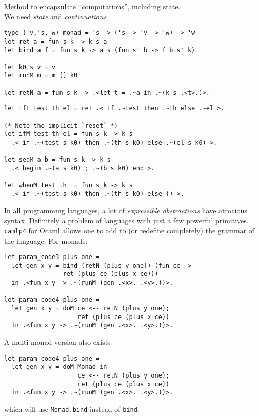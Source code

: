 \documentclass[landscape]{slides}
\begin{document}
\begin{slide}
    Method to encapsulate ``computations'', including state.\\
    We need \emph{state} and \emph{continuations}
\begin{verbatim}
type ('v,'s,'w) monad = 's -> ('s -> 'v -> 'w) -> 'w
let ret a = fun s k -> k s a
let bind a f = fun s k -> a s (fun s' b -> f b s' k)

let k0 s v = v
let runM m = m [] k0

let retN a = fun s k -> .<let t = .~a in .~(k s .<t>.)>.
\end{verbatim}
\end{slide}

\begin{slide}
\begin{verbatim}
let ifL test th el = ret .< if .~test then .~th else .~el >.

(* Note the implicit `reset` *)
let ifM test th el = fun s k -> k s
  .< if .~(test s k0) then .~(th s k0) else .~(el s k0) >.

let seqM a b = fun s k -> k s 
  .< begin .~(a s k0) ; .~(b s k0) end >.

let whenM test th  = fun s k -> k s 
  .< if .~(test s k0) then .~(th s k0) else () >.
\end{verbatim}
\end{slide}

\begin{slide}
    In all programming languages, a lot of \emph{expressible abstractions}
    have atrocious syntax.  Definitely a problem of languages with
    just a few powerful primitives. \texttt{camlp4} for Ocaml allows one to add
    to (or redefine completely) the grammar of the language.  For monads:
\begin{verbatim}
let param_code3 plus one =
  let gen x y = bind (retN (plus y one)) (fun ce -> 
                ret (plus ce (plus x ce)))
  in .<fun x y -> .~(runM (gen .<x>. .<y>.))>.

let param_code4 plus one =
  let gen x y = doM ce <-- retN (plus y one);
                    ret (plus ce (plus x ce))
  in .<fun x y -> .~(runM (gen .<x>. .<y>.))>.
\end{verbatim}
\end{slide}

\begin{slide}
A multi-monad version also exists
\begin{verbatim}
let param_code4 plus one =
  let gen x y = doM Monad in
                    ce <-- retN (plus y one);
                    ret (plus ce (plus x ce))
  in .<fun x y -> .~(runM (gen .<x>. .<y>.))>.
\end{verbatim}
which will use \verb+Monad.bind+ instead of \verb+bind+.
\end{slide}
\end{document}
